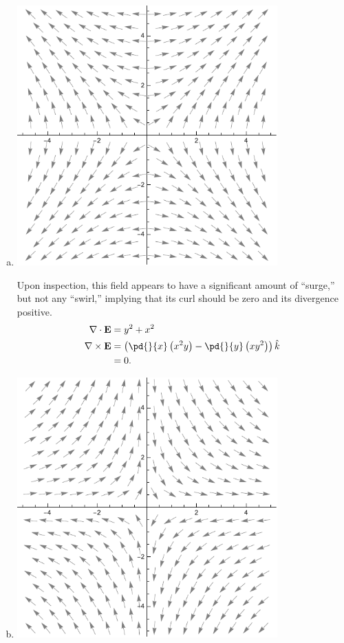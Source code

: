\documentclass[10pt]{mypackage}
\begin{document}
\begin{enumerate}[(a)]
  \item 
    \begin{center}
      \includegraphics[width=10cm]{images/p_2a_1_12-19a.pdf}
    \end{center}
    Upon inspection, this field appears to have a significant amount of ``surge,'' but not any ``swirl,'' implying that its curl should be zero and its divergence positive.
    \begin{align*}
      \nabla \cdot \mathbf{E} &= y^2 + x^2\\
      \nabla \times \mathbf{E} &= \left(\pd{}{x}\left(x^2 y\right) - \pd{}{y}\left(xy^2\right)\right)\hat{k}\\
                               &= 0.
    \end{align*}
  \item 
    \begin{center}
      \includegraphics[width=10cm]{images/p_2a_1_12-19b.pdf}

\end{center}
\end{enumerate}
\end{document}

